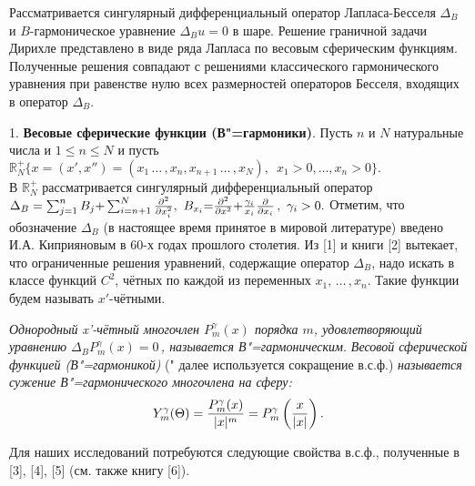 \vzmscaption


Рассматривается сингулярный дифференциальный оператор Лапласа\--Бесселя $\Delta_B$ и $B$-гармоническое уравнение $\Delta_B u=0$ в шаре. Решение граничной задачи Дирихле представлено в виде ряда Лапласа по весовым сферическим функциям. Полученные решения совпадают с решениями классического гармонического уравнения при равенстве нулю всех размерностей операторов Бесселя, входящих в оператор $\Delta_B$.





  1. {\bf Весовые сферические функции (В"=гармоники)}.
Пусть $n$ и $N$ натуральные числа и $1{\le}n{\le}N$ и пусть\\
$\mathbb{R}^+_N \{x{=}(x',x'')
{=}(x_1\,\ldots\,,x_n,x_{n+1}\,\ldots\,,x_N),\,\,\, x_1{>}0,\ldots,x_n{>}0\}.$ \\
 В $\mathbb{R}_N^+$ рассматривается сингулярный
дифференциальный оператор
$\Delta_B=\sum_{j=1}^nB_j{+}\sum_{i=n+1}^N{\partial^2\over\partial x_i^2},
\,\, B_{x_i}{=}{{\partial^2}\over {\partial x^2}}{+}{\gamma_i\over {x_i}}
{\partial\over{\partial x_i}}\,,\,\, \gamma_i>0.$ Отметим, что обозначение $\Delta_B$ (в настоящее время принятое в мировой литературе) введено И.А. Киприяновым в 60-х годах прошлого столетия. Из [1] %
и книги [2]
вытекает, что ограниченные решения уравнений, содержащие оператор $\Delta_B$, надо искать в классе функций $C^2$, чётных по каждой из переменных $x_1,\,\ldots\,,x_n$. Такие функции будем называть $x'$-чётными.


{\it Однородный x'-чётный многочлен $P_m^\gamma(x)$ порядка $m$,  удовлетворяющий
уравнению $ \Delta_BP_m^\gamma(x)= 0$\,, называется В"=гармоническим.}
{\it Весовой сферической функцией (В"=гармоникой)} (" далее используется сокращение в.с.ф.)
{\it называется сужение В"=гармонического многочлена на сферу:}
$$Y_m^\gamma(\Theta)={P_m^\gamma(x)\over|x|^m}= P_m^\gamma\left(x\over|x|
\right).$$

    Для наших исследований потребуются следующие свойства в.с.ф., полученные в [3], [4], [5]
 (см. также книгу [6]).

